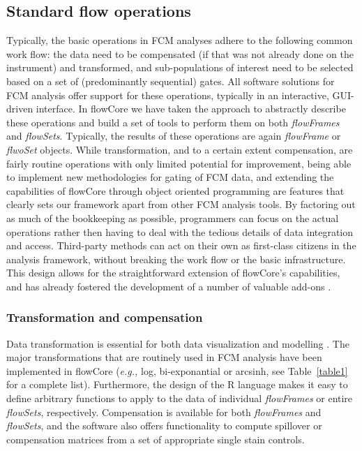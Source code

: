 \documentclass[10pt]{bmc_article}
\newcommand{\Rpackage}[1]{{\textsf{#1}}}
\newcommand{\Rclass}[1]{{\textit{#1}}}
\newenvironment{bmcformat}{\begin{raggedright}\baselineskip20pt\sloppy\setboolean{publ}{false}}{\end{raggedright}\baselineskip20pt\sloppy}
\begin{document}
\begin{bmcformat}
\subsection*{Standard flow operations}
Typically, the basic operations in FCM analyses adhere to the
following common work flow: the data need to be compensated (if that
was not already done on the instrument) and transformed, and
sub-populations of interest need to be selected based on a set of
(predominantly sequential) gates. All software solutions for FCM
analysis offer support for these operations, typically in an
interactive, GUI-driven interface. In \Rpackage{flowCore} we have
taken the approach to abstractly describe these operations and build a
set of tools to perform them on both \Rclass{flowFrames} and
\Rclass{flowSets}. Typically, the results of these operations are
again \Rclass{flowFrame} or \Rclass{flwoSet} objects. While
transformation, and to a certain extent compensation, are fairly
routine operations with only limited potential for improvement, being
able to implement new methodologies for gating of FCM data, and
extending the capabilities of \Rpackage{flowCore} through object
oriented programming are features that clearly sets our framework
apart from other FCM analysis tools. By factoring out as much of the
bookkeeping as possible, programmers can focus on the actual
operations rather then having to deal with the tedious details of data
integration and access. Third-party methods can act on their own as
first-class citizens in the analysis framework, without breaking the
work flow or the basic infrastructure. This design allows for the
straightforward extension of \Rpackage{flowCore}'s capabilities, and
has already fostered the development of a number of valuable add-ons
\cite{lo2008agf,sarkar2008ufv}.

\subsubsection*{Transformation and compensation}
Data transformation is essential for both data visualization and
modelling \cite{lo2008agf}. The major transformations that are
routinely used in FCM analysis have been implemented in
\Rpackage{flowCore} (\textit{e.g.,} log, bi-exponantial or arcsinh,
see Table~\ref{table1} for a complete list). Furthermore, the design
of the R language makes it easy to define arbitrary functions to apply
to the data of individual \Rclass{flowFrames} or entire
\Rclass{flowSets}, respectively. Compensation is available for both
\Rclass{flowFrames} and \Rclass{flowSets}, and the software also
offers functionality to compute spillover or compensation matrices
from a set of appropriate single stain controls.


\end{bmcformat}
\end{document}
